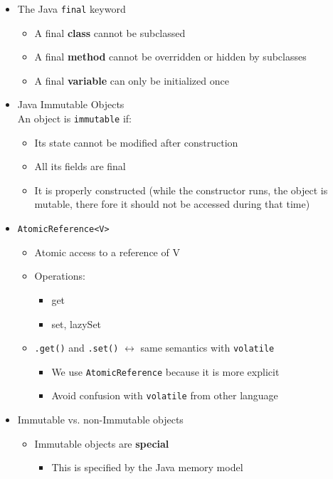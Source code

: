 \documentclass[a4paper]{article}
\newcommand{\inline}[1]{\lstinline!#1!}%
\begin{document}
\begin{itemize}
\begin{itemize}
			\end{itemize}
		\item The Java \inline{final} keyword
			\begin{itemize}
				\item A final \textbf{class} cannot be subclassed
				\item A final \textbf{method} cannot be overridden or hidden by subclasses
				\item A final \textbf{variable} can only be initialized once
			\end{itemize}
		\item Java Immutable Objects
		\\An object is \inline{immutable} if:
			\begin{itemize}
				\item Its state cannot be modified after construction
				\item All its fields are final
				\item It is properly constructed (while the constructor runs, the object is mutable, there fore it should not be accessed during that time)
			\end{itemize}
		\item \inline{AtomicReference<V>}
			\begin{itemize}
				\item Atomic access to a reference of V
				\item Operations:
					\begin{itemize}
						\item get
						\item set, lazySet
					\end{itemize}
				\item \inline{.get()} and \inline{.set()} $\leftrightarrow$ same semantics with \inline{volatile}
					\begin{itemize}
						\item We use \inline{AtomicReference} because it is more explicit
						\item Avoid confusion with \inline{volatile} from other language
					\end{itemize}
			\end{itemize}
		\item Immutable vs. non-Immutable objects
			\begin{itemize}
				\item Immutable objects are \textbf{special}
					\begin{itemize}
						\item This is specified by the Java memory model

\end{itemize}
\end{itemize}
\end{itemize}
\end{document}
